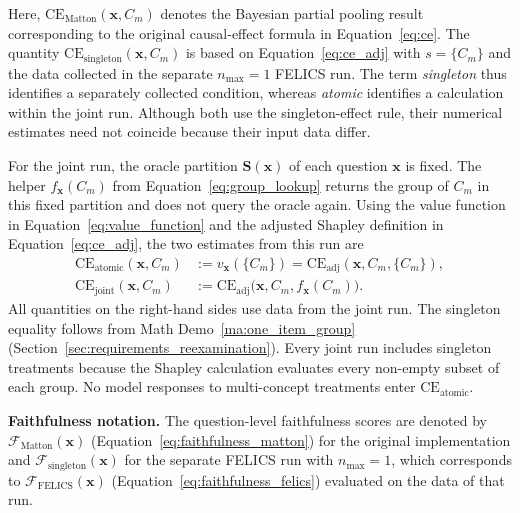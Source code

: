 Here, $\mathrm{CE}_{\mathrm{Matton}}(\mathbf{x},C_m)$ denotes the Bayesian partial pooling result corresponding to the original causal-effect formula in Equation~\ref{eq:ce}. The quantity $\mathrm{CE}_{\mathrm{singleton}}(\mathbf{x},C_m)$ is based on Equation~\ref{eq:ce_adj} with $s=\{C_m\}$ and the data collected in the separate $n_{\max}=1$ FELICS run. The term \emph{singleton} thus identifies a separately collected condition, whereas \emph{atomic} identifies a calculation within the joint run. Although both use the singleton-effect rule, their numerical estimates need not coincide because their input data differ.

For the joint run, the oracle partition $\mathbf{S}(\mathbf{x})$ of each question $\mathbf{x}$ is fixed. The helper $f_{\mathbf{x}}(C_m)$ from Equation~\ref{eq:group_lookup} returns the group of $C_m$ in this fixed partition and does not query the oracle again. Using the value function in Equation~\ref{eq:value_function} and the adjusted Shapley definition in Equation~\ref{eq:ce_adj}, the two estimates from this run are
\begin{align}
	\label{eq:evaluation_ce_atomic}
	\mathrm{CE}_{\mathrm{atomic}}(\mathbf{x},C_m)
	 & :=v_{\mathbf{x}}(\{C_m\})
	=\mathrm{CE}_{\mathrm{adj}}(\mathbf{x},C_m,\{C_m\}),                           \\
	\label{eq:evaluation_ce_joint}
	\mathrm{CE}_{\mathrm{joint}}(\mathbf{x},C_m)
	 & :=\mathrm{CE}_{\mathrm{adj}}\bigl(\mathbf{x},C_m,f_{\mathbf{x}}(C_m)\bigr).
\end{align}
All quantities on the right-hand sides use data from the joint run. The singleton equality follows from Math Demo~\ref{ma:one_item_group} (Section~\ref{sec:requirements_reexamination}). Every joint run includes singleton treatments because the Shapley calculation evaluates every non-empty subset of each group. No model responses to multi-concept treatments enter $\mathrm{CE}_{\mathrm{atomic}}$.

\noindent\textbf{Faithfulness notation.} The question-level faithfulness scores are denoted by $\mathcal{F}_{\mathrm{Matton}}(\mathbf{x})$ (Equation~\ref{eq:faithfulness_matton}) for the original implementation and $\mathcal{F}_{\mathrm{singleton}}(\mathbf{x})$ for the separate FELICS run with $n_{\max}=1$, which corresponds to $\mathcal{F}_{\mathrm{FELICS}}(\mathbf{x})$ (Equation~\ref{eq:faithfulness_felics}) evaluated on the data of that run.

